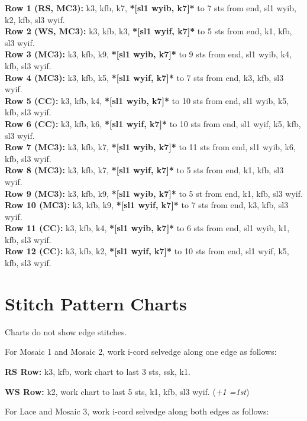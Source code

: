 \documentclass[12pt]{article}
\newcommand{\rowDir}[1]{\textbf{#1:}} %
\renewcommand{\repeat}[1]{\textbf{*[#1]*}} %
\newcommand{\increase}[1]{(\emph{+#1 
	\ifnum#1=1{st}\else{sts}\fi})}
\begin{document}
\rowDir{Row 1 (RS, MC3)} k3, kfb, k7, \repeat{sl1 wyib, k7} to 7 sts from end, sl1 wyib, k2, kfb, sl3 wyif. \\
\rowDir{Row 2 (WS, MC3)} k3, kfb, k3, \repeat{sl1 wyif, k7} to 5 sts from end, k1, kfb, sl3 wyif. \\
\rowDir{Row 3 (MC3)} k3, kfb, k9, \repeat{sl1 wyib, k7} to 9 sts from end, sl1 wyib, k4, kfb, sl3 wyif. \\
\rowDir{Row 4 (MC3)} k3, kfb, k5, \repeat{sl1 wyif, k7} to 7 sts from end, k3, kfb, sl3 wyif. \\
\rowDir{Row 5 (CC)} k3, kfb, k4, \repeat{sl1 wyib, k7} to 10 sts from end, sl1 wyib, k5, kfb, sl3 wyif. \\
\rowDir{Row 6 (CC)} k3, kfb, k6, \repeat{sl1 wyif, k7} to 10 sts from end, sl1 wyif, k5, kfb, sl3 wyif. \\
\rowDir{Row 7 (MC3)} k3, kfb, k7, \repeat{sl1 wyib, k7} to 11 sts from end, sl1 wyib, k6, kfb, sl3 wyif. \\
\rowDir{Row 8 (MC3)} k3, kfb, k7, \repeat{sl1 wyif, k7} to 5 sts from end, k1, kfb, sl3 wyif. \\
\rowDir{Row 9 (MC3)} k3, kfb, k9, \repeat{sl1 wyib, k7} to 5 st from end, k1, kfb, sl3 wyif. \\
\rowDir{Row 10 (MC3)} k3, kfb, k9, \repeat{sl1 wyif, k7} to 7 sts from end, k3, kfb, sl3 wyif. \\
\rowDir{Row 11 (CC)} k3, kfb, k4, \repeat{sl1 wyib, k7} to 6 sts from end, sl1 wyib, k1, kfb, sl3 wyif. \\
\rowDir{Row 12 (CC)} k3, kfb, k2, \repeat{sl1 wyif, k7} to 10 sts from end, sl1 wyif, k5, kfb, sl3 wyif. 

\newpage
\section*{Stitch Pattern Charts}

Charts do not show edge stitches. 

For Mosaic 1 and Mosaic 2, work i-cord selvedge along one edge as follows:

\hspace{2em} \rowDir{RS Row} k3, kfb, work chart to last 3 sts, ssk, k1.

\hspace{2em} \rowDir{WS Row} k2, work chart to last 5 sts, k1, kfb, sl3 wyif. \increase{1}

For Lace and Mosaic 3, work i-cord selvedge along both edges as follows:
\end{document}

